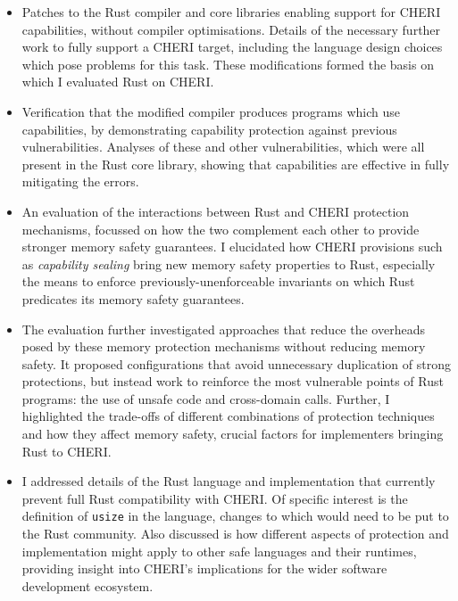 \documentclass[dissertation.tex]{subfiles}
\begin{document}
\begin{itemize}
    \item Patches to the Rust compiler and core libraries enabling
    support for CHERI capabilities, without compiler optimisations.
    Details of the necessary further work to fully support a CHERI
    target, including the language design choices which pose problems
    for this task.
    These modifications formed the basis on which I evaluated Rust on
    CHERI.

    \item Verification that the modified compiler produces programs
    which use capabilities, by demonstrating capability protection
    against previous vulnerabilities.
    Analyses of these and other vulnerabilities, which were all present
    in the Rust core library, showing that capabilities are effective in
    fully mitigating the errors.

    \item An evaluation of the interactions between Rust and CHERI
    protection mechanisms, focussed on how the two complement each
    other to provide stronger memory safety guarantees.
    I elucidated how CHERI provisions such as \emph{capability sealing}
    bring new memory safety properties to Rust, especially the means
    to enforce previously-unenforceable invariants on which Rust
    predicates its memory safety guarantees.

    \item The evaluation further investigated approaches that reduce the
    overheads posed by these memory protection mechanisms without
    reducing memory safety.
    It proposed configurations that avoid unnecessary duplication of
    strong protections, but instead work to reinforce the most
    vulnerable points of Rust programs: the use of unsafe code and
    cross-domain calls.
    Further, I highlighted the trade-offs of different combinations of
    protection techniques and how they affect memory safety, crucial
    factors for implementers bringing Rust to CHERI.

    \item I addressed details of the Rust language and implementation
    that currently prevent full Rust compatibility with CHERI.
    Of specific interest is the definition of \texttt{usize} in the
    language, changes to which would need to be put to the Rust
    community.
    Also discussed is how different aspects of protection and
    implementation might apply to other safe languages and their
    runtimes, providing insight into CHERI's implications for the wider
    software development ecosystem.
\end{itemize}
\end{document}

